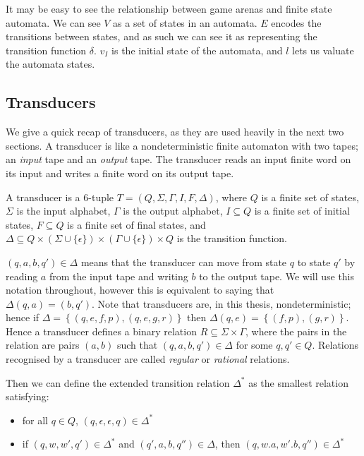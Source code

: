 \documentclass[10pt, a4paper]{report}
\begin{document}
It may be easy to see the relationship between game arenas and finite state
automata. We can see $V$ as a set of states in an automata. $E$ encodes the
transitions between states, and as such we can see it as representing the
transition function $\delta$. $v_I$ is the initial state of the automata, and
$l$ lets us valuate the automata states. 

\subsection{Transducers}
\label{sec:Transducers}

We give a quick recap of transducers, as they are used heavily in the next two
sections. A transducer is like a nondeterministic finite automaton with two
tapes; an \emph{input} tape and an \emph{output} tape. The transducer reads
an input finite word on its input and writes a finite word on its output tape.

A transducer is a 6-tuple $T = (Q, \Sigma, \Gamma, I, F, \Delta)$, where $Q$ is
a finite set of states, $\Sigma$ is the input alphabet, $\Gamma$ is the output
alphabet, $I \subseteq Q$ is a finite set of initial states, $F \subseteq Q$ is
a finite set of final states, and $\Delta \subseteq Q \times \left( \Sigma \cup
  \{\epsilon\} \right) \times \left( \Gamma \cup \{\epsilon\} \right) \times Q$
is the transition function.

$(q, a, b, q') \in \Delta$ means that the transducer can move from state $q$ to
state $q'$ by reading $a$ from the input tape and writing $b$ to the output
tape. We will use this notation throughout, however this is equivalent to saying
that $\Delta(q, a) = (b, q')$. Note that transducers are, in this thesis,
nondeterministic; hence if $\Delta = \left\{ (q, e, f, p), (q, e, g, r)
\right\}$ then $\Delta(q, e) = \left\{ (f, p), (g, r) \right\}$. Hence a
transducer defines a binary relation $R \subseteq \Sigma \times \Gamma$, where
the pairs in the relation are pairs $(a, b)$ such that $(q, a, b, q') \in
\Delta$ for some $q, q' \in Q$. Relations recognised by a transducer are
called \emph{regular} or \emph{rational} relations.

Then we can define the extended transition relation $\Delta^\ast$ as the
smallest relation satisfying:

\begin{itemize}
\item for all $q \in Q$, $(q, \epsilon, \epsilon, q) \in \Delta^\ast$
\item if $(q, w, w', q') \in \Delta^\ast$ and $(q', a, b, q'') \in \Delta$, then
  $(q, w . a, w' . b, q'') \in \Delta^\ast$
  
\end{itemize}
\end{document}
